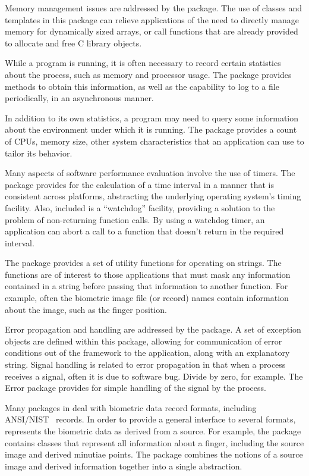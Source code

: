 Memory management issues are addressed by the  package. The use
of classes and templates in this package can relieve applications of the need
to directly manage memory for dynamically sized arrays, or call functions
that are already provided to allocate and free C library objects.

While a program is running, it is often necessary to record certain statistics
about the process, such as memory and processor usage. The 
package provides methods to obtain this information, as well as the capability
to log to a file periodically, in an asynchronous manner.

In addition to its own statistics, a program may need to query some
information about the environment under which it is running. The 
package provides a count of CPUs, memory size, other system characteristics
that an application can use to tailor its behavior.

Many aspects of software performance evaluation involve the use of timers. The
 package provides for the calculation of a time interval in a manner
that is consistent across platforms, abstracting the underlying operating
system's timing facility. Also, included is a ``watchdog'' facility, providing
a solution to the problem of non-returning function calls. By using a watchdog
timer, an application can abort a call to a function that doesn't return in
the required interval.

The  package provides a set of utility functions for operating on
strings. The  functions are of interest to
those applications that must mask any information contained in a string before
passing that information to another function. For example, often the biometric
image file (or record) names contain information about the image, such as the
finger position.

Error propagation and handling are addressed by the  package. A set
of exception objects are defined within this package, allowing for communication
of error conditions out of the framework to the application, along with an
explanatory string. Signal handling is related to error propagation in that
when a process receives a signal, often it is due to software bug. Divide by
zero, for example. The Error package provides for simple handling of the signal 
by the process.

Many packages in \sname deal with biometric data record formats, including
ANSI/NIST~\cite{std:an2k} records. In order to provide a general interface
to several formats, \sname represents the biometric data as derived from
a source. For example, the  package contains classes that represent
all information about a finger, including the source image and derived
minutiae points. The  package combines the notions of a source
image and derived information together into a single abstraction.

